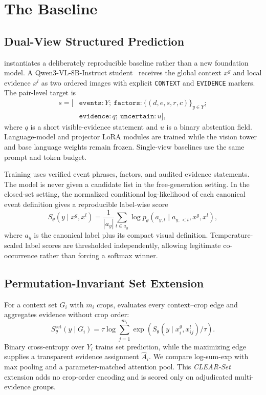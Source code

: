 \section{The \method Baseline}
\label{sec:method}



\subsection{Dual-View Structured Prediction}

\method instantiates a deliberately reproducible baseline rather than a new foundation model. A Qwen3-VL-8B-Instruct student~\cite{bai2025qwen3vl} receives the global context $x^g$ and local evidence $x^l$ as two ordered images with explicit \texttt{CONTEXT} and \texttt{EVIDENCE} markers. The pair-level target is
\begin{equation}
\begin{aligned}
s=[&\texttt{events}:Y;\ \texttt{factors}:\{(d,e,s,r,c)\}_{y\in Y};\\
   &\texttt{evidence}:q;\ \texttt{uncertain}:u],
\end{aligned}
\end{equation}
where $q$ is a short visible-evidence statement and $u$ is a binary abstention field. Language-model and projector LoRA modules are trained while the vision tower and base language weights remain frozen. Single-view baselines use the same prompt and token budget.

Training uses verified event phrases, factors, and audited evidence statements. The model is never given a candidate list in the free-generation setting. In the closed-set setting, the normalized conditional log-likelihood of each canonical event definition gives a reproducible label-wise score
\begin{equation}
 S_{\theta}(y\mid x^g,x^l)=\frac{1}{|a_y|}\sum_{t\in a_y}
 \log p_{\theta}(a_{y,t}\mid a_{y,<t},x^g,x^l),
\end{equation}
where $a_y$ is the canonical label plus its compact visual definition. Temperature-scaled label scores are thresholded independently, allowing legitimate co-occurrence rather than forcing a softmax winner.

\subsection{Permutation-Invariant Set Extension}

For a context set $G_i$ with $m_i$ crops, \method evaluates every context--crop edge and aggregates evidence without crop order:
\begin{equation}
 S_{\theta}^{\mathrm{set}}(y\mid G_i)=
 \tau\log\sum_{j=1}^{m_i}\exp\!\left(S_{\theta}(y\mid x_i^g,x_{ij}^l)/\tau\right).
\end{equation}
Binary cross-entropy over $Y_i$ trains set prediction, while the maximizing edge supplies a transparent evidence assignment $\hat{A}_i$. We compare log-sum-exp with max pooling and a parameter-matched attention pool. This \emph{CLEAR-Set} extension adds no crop-order encoding and is scored only on adjudicated multi-evidence groups.

